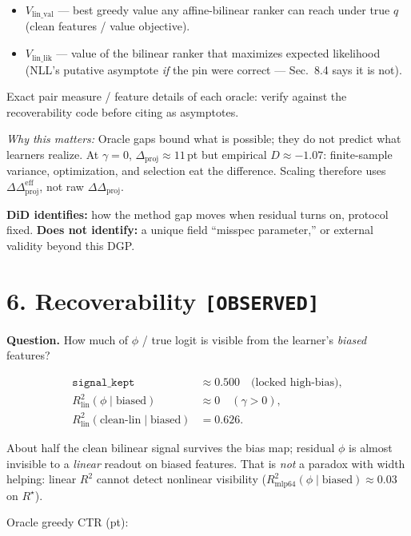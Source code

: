 \documentclass[11pt]{article}
\newcommand{\phonesection}[1]{\Needspace{8\baselineskip}\section*{#1}}
\newcommand{\stag}[1]{\texttt{[#1]}}
\newcommand{\Rstar}{R^{\star}}
\newcommand{\Dproj}{\Delta_{\mathrm{proj}}}
\newcommand{\DDproj}{\Delta\Delta_{\mathrm{proj}}}
\newcommand{\DDprojeff}{\Delta\Delta_{\mathrm{proj}}^{\mathrm{eff}}}
\newcommand{\why}[1]{\par{\footnotesize\color{blue!35!black}\textit{Why this matters:} #1\par}}
\begin{document}
\begin{itemize}
  \item $V_{\mathrm{lin\_val}}$ --- best
        greedy value any affine-bilinear
        ranker can reach under true $q$
        (clean features / value objective).
  \item $V_{\mathrm{lin\_lik}}$ --- value of
        the bilinear ranker that maximizes
        expected likelihood (NLL's putative
        asymptote \emph{if} the pin were
        correct --- Sec.~8.4 says it is not).
\end{itemize}
Exact pair measure / feature details of each
oracle: verify against the recoverability
code before citing as asymptotes.

\why{Oracle gaps bound what is possible;
they do not predict what learners realize.
At $\gamma{=}0$, $\Dproj\approx 11$\,pt but
empirical $D\approx -1.07$: finite-sample
variance, optimization, and selection eat
the difference.  Scaling therefore uses
$\DDprojeff$, not raw $\DDproj$.}

\textbf{DiD identifies:} how the method gap
moves when residual turns on, protocol fixed.
\textbf{Does not identify:} a unique field
``misspec parameter,'' or external validity
beyond this DGP.

\phonesection{6. Recoverability \stag{OBSERVED}}

\textbf{Question.} How much of $\phi$ / true
logit is visible from the learner's
\emph{biased} features?

\begin{align*}
\texttt{signal\_kept}
  &\approx 0.500
  \quad\text{(locked high-bias)},\\
R^{2}_{\mathrm{lin}}(\phi\mid\mathrm{biased})
  &\approx 0
  \quad(\gamma{>}0),\\
R^{2}_{\mathrm{lin}}(\mathrm{clean\text{-}lin}\mid\mathrm{biased})
  &= 0.626.
\end{align*}

About half the clean bilinear signal
survives the bias map; residual $\phi$ is
almost invisible to a \emph{linear} readout
on biased features.  That is \emph{not} a
paradox with width helping: linear $R^{2}$
cannot detect nonlinear visibility
($R^{2}_{\mathrm{mlp64}}(\phi\mid\mathrm{biased})\approx 0.03$
on $\Rstar$).

Oracle greedy CTR (pt):
\end{document}
